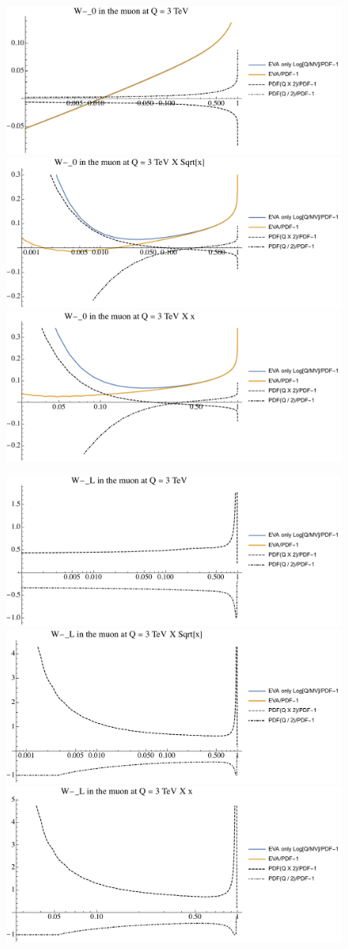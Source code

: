 \documentclass[a4paper,11pt]{article}
\begin{document}
\begin{figure}[ht]
\includegraphics[width=0.46\linewidth]{PlotPDFs/ratios/3TeV/W-_0_Q.pdf}
\includegraphics[width=0.46\linewidth]{PlotPDFs/ratios/3TeV/W-_0_Qsqrtx.pdf}
\includegraphics[width=0.46\linewidth]{PlotPDFs/ratios/3TeV/W-_0_Qx.pdf}
\end{figure}

\begin{figure}[ht]
\includegraphics[width=0.46\linewidth]{PlotPDFs/ratios/3TeV/W-_L_Q.pdf}
\includegraphics[width=0.46\linewidth]{PlotPDFs/ratios/3TeV/W-_L_Qsqrtx.pdf}
\includegraphics[width=0.46\linewidth]{PlotPDFs/ratios/3TeV/W-_L_Qx.pdf}
\end{figure}
\end{document}
